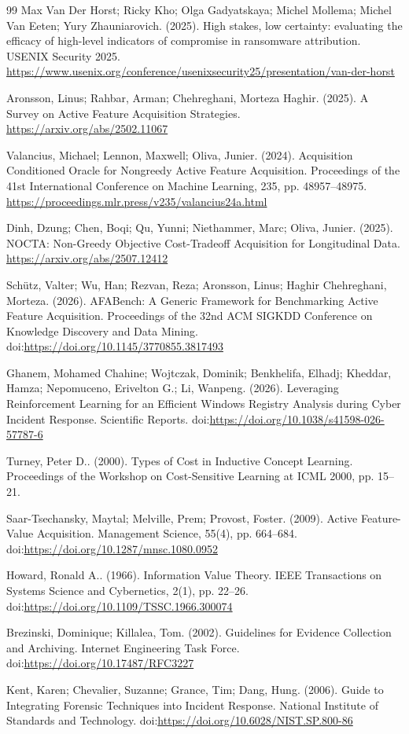 \documentclass[conference,a4paper,10pt]{IEEEtran}
\begin{document}
\begin{thebibliography}{99}
 Max Van Der Horst; Ricky Kho; Olga Gadyatskaya; Michel Mollema; Michel Van Eeten; Yury Zhauniarovich. (2025). High stakes, low certainty: evaluating the efficacy of high-level indicators of compromise in ransomware attribution. USENIX Security 2025. \url{https://www.usenix.org/conference/usenixsecurity25/presentation/van-der-horst}

 Aronsson, Linus; Rahbar, Arman; Chehreghani, Morteza Haghir. (2025). A Survey on Active Feature Acquisition Strategies. \url{https://arxiv.org/abs/2502.11067}

 Valancius, Michael; Lennon, Maxwell; Oliva, Junier. (2024). Acquisition Conditioned Oracle for Nongreedy Active Feature Acquisition. Proceedings of the 41st International Conference on Machine Learning, 235, pp. 48957–48975. \url{https://proceedings.mlr.press/v235/valancius24a.html}

 Dinh, Dzung; Chen, Boqi; Qu, Yunni; Niethammer, Marc; Oliva, Junier. (2025). NOCTA: Non-Greedy Objective Cost-Tradeoff Acquisition for Longitudinal Data. \url{https://arxiv.org/abs/2507.12412}

 Sch\"{u}tz, Valter; Wu, Han; Rezvan, Reza; Aronsson, Linus; Haghir Chehreghani, Morteza. (2026). AFABench: A Generic Framework for Benchmarking Active Feature Acquisition. Proceedings of the 32nd ACM SIGKDD Conference on Knowledge Discovery and Data Mining. doi:\url{https://doi.org/10.1145/3770855.3817493}

 Ghanem, Mohamed Chahine; Wojtczak, Dominik; Benkhelifa, Elhadj; Kheddar, Hamza; Nepomuceno, Erivelton G.; Li, Wanpeng. (2026). Leveraging Reinforcement Learning for an Efficient Windows Registry Analysis during Cyber Incident Response. Scientific Reports. doi:\url{https://doi.org/10.1038/s41598-026-57787-6}

 Turney, Peter D.. (2000). Types of Cost in Inductive Concept Learning. Proceedings of the Workshop on Cost-Sensitive Learning at ICML 2000, pp. 15–21.

 Saar-Tsechansky, Maytal; Melville, Prem; Provost, Foster. (2009). Active Feature-Value Acquisition. Management Science, 55(4), pp. 664–684. doi:\url{https://doi.org/10.1287/mnsc.1080.0952}

 Howard, Ronald A.. (1966). Information Value Theory. IEEE Transactions on Systems Science and Cybernetics, 2(1), pp. 22–26. doi:\url{https://doi.org/10.1109/TSSC.1966.300074}

 Brezinski, Dominique; Killalea, Tom. (2002). Guidelines for Evidence Collection and Archiving. Internet Engineering Task Force. doi:\url{https://doi.org/10.17487/RFC3227}

 Kent, Karen; Chevalier, Suzanne; Grance, Tim; Dang, Hung. (2006). Guide to Integrating Forensic Techniques into Incident Response. National Institute of Standards and Technology. doi:\url{https://doi.org/10.6028/NIST.SP.800-86}
\end{thebibliography}
\end{document}

